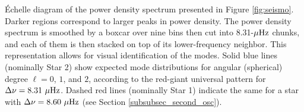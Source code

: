 \label{fig:echelle} \'Echelle diagram of the power density spectrum presented in Figure \ref{fig:seismo}. Darker regions correspond to larger peaks in power density. The power density spectrum is smoothed by a boxcar over nine bins then cut into 8.31-$\mu\rm{Hz}$ chunks, and each of them is then stacked on top of its lower-frequency neighbor. This representation allows for visual identification of the modes. Solid blue lines (nominally Star 2) show expected mode distributions for angular (spherical) degree $\ell = 0$, $1$, and $2$, according to the red-giant universal pattern \citep{mos10} for $\Delta\nu = 8.31\ \mu\rm{Hz}$. Dashed red lines (nominally Star 1) indicate the same for a star with $\Delta\nu = 8.60\ \mu\rm{Hz}$ (see Section \ref{subsubsec_second_osc}).

  
  